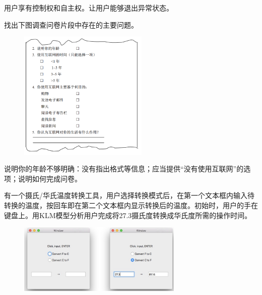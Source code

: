 \begin{solution}
用户享有控制权和自主权。让用户能够退出异常状态。
\end{solution}



\begin{problem}[2012]
找出下图调查问卷片段中存在的主要问题。

\begin{figure}[H]
    \vspace{-0.5em}
    \centering
    \includegraphics[width=0.55\textwidth]{2012问卷.png}
    \vspace{-1em}
\end{figure}
\end{problem}

\begin{solution}
说明你的年龄不够明确：没有指出格式等信息；应当提供“没有使用互联网”的选项；说明如何完成问卷。
\end{solution}



\begin{problem}[2015、2023]
有一个摄氏/华氏温度转换工具，用户选择转换模式后，在第一个文本框内输入待转换的温度，按回车即在第二个文本框内显示转换后的温度。初始时，用户的手在键盘上。用KLM模型分析用户完成将27.3摄氏度转换成华氏度所需的操作时间。

\begin{figure}[H]
    \vspace{-0.5em}
    \centering
    \includegraphics[width=0.7\textwidth]{2015KLM.png}
    \vspace{-1em}
\end{figure}
\end{problem}



